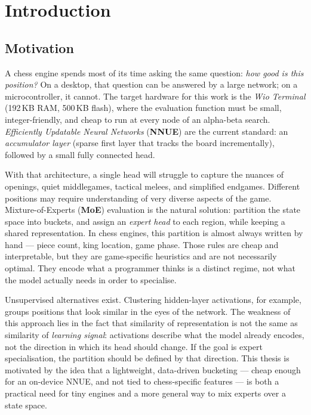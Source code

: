 \chapter{Introduction}\label{ch:introduction}

\section{Motivation}\label{sec:motivation}

A chess engine spends most of its time asking the same question: \emph{how good is this position?} On a desktop, that question can be answered by a large network; on a microcontroller, it cannot. The target hardware for this work is the \emph{Wio Terminal} (192\,KB RAM, 500\,KB flash), where the evaluation function must be small, integer-friendly, and cheap to run at every node of an alpha-beta search. \emph{Efficiently Updatable Neural Networks} (\textbf{NNUE}) are the current standard: an \emph{accumulator layer} (sparse first layer that tracks the board incrementally), followed by a small fully connected head.

With that architecture, a single head will struggle to capture the nuances of openings, quiet middlegames, tactical melees, and simplified endgames. Different positions may require understanding of very diverse aspects of the game. Mixture-of-Experts (\textbf{MoE}) evaluation is the natural solution: partition the state space into buckets, and assign an \emph{expert head} to each region, while keeping a shared representation. In chess engines, this partition is almost always written by hand --- piece count, king location, game phase. Those rules are cheap and interpretable, but they are game-specific heuristics and are not necessarily optimal. They encode what a programmer thinks is a distinct regime, not what the model actually needs in order to specialise.

Unsupervised alternatives exist. Clustering hidden-layer activations, for example, groups positions that look similar in the eyes of the network. The weakness of this approach lies in the fact that similarity of representation is not the same as similarity of \emph{learning signal}: activations describe what the model already encodes, not the direction in which its head should change. If the goal is expert specialisation, the partition should be defined by that direction. This thesis is motivated by the idea that a lightweight, data-driven bucketing --- cheap enough for an on-device NNUE, and not tied to chess-specific features --- is both a practical need for tiny engines and a more general way to mix experts over a state space.

